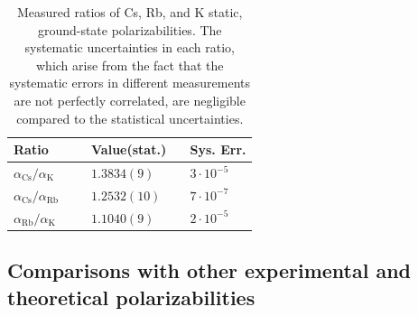 \documentclass[twocolumn,pra,showpacs,superscriptaddress,longbibliography]{revtex4-1}   %
\newcommand{\sspace}{$\enspace$}
\newcommand{\ssspace}{$\quad$}
\newcommand{\ak}{\alpha_{\textrm{K}}}
\newcommand{\arb}{\alpha_{\textrm{Rb}}}
\newcommand{\acs}{\alpha_{\textrm{Cs}}}
\newcommand{\ratRbK}{1.1040(9)}
\newcommand{\ratCsK}{1.3834(9)}
\newcommand{\ratCsRb}{1.2532(10)}
\begin{document}
\begingroup
\begin{table}
\caption{\label{tableRatio}Measured ratios of Cs, Rb, and K static, ground-state polarizabilities. The systematic uncertainties in each ratio, which arise from the fact that the systematic errors in different measurements are not perfectly correlated, are negligible compared to the statistical uncertainties.}
\begin{center}
\begin{tabular}{lll}
\hline\hline
Ratio \ssspace \ssspace & Value(stat.) \sspace & Sys. Err. \\
\hline
$\acs/\ak$  & $\ratCsK$ & $3\cdot 10^{-5}$  \\
$\acs/\arb$ & $\ratCsRb$ & $7\cdot 10^{-7}$ \\
$\arb/\ak$  & $\ratRbK$ & $2\cdot 10^{-5}$ \\
\hline\hline
\end{tabular}
\end{center}
\end{table}
\endgroup

\subsection{Comparisons with other experimental and theoretical polarizabilities} \label{sectionComparisonsWithOtherExpTheory}
\end{document}
